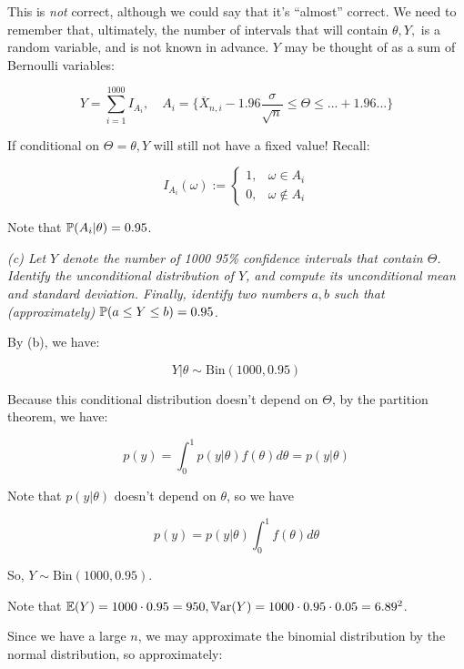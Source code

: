             This is \textit{not} correct, although we could say that it's
            ``almost'' correct. We need to remember that, ultimately, the
            number of intervals that will contain $\theta, Y,$ is a random
            variable, and is not known in advance. $Y$ may be thought of as
            a sum of Bernoulli variables:

            \[
                Y = \sum_{i=1}^{1000} I_{A_i}, \quad A_i =\{\overline
                X_{n,i} - 1.96 \frac{\sigma}{\sqrt{n}} \leq \Theta \leq ...
                + 1.96 ... \}
            \]

            If conditional on $\Theta = \theta, Y$ will still not have a
            fixed value! Recall:

            \[
                I_{A_i}(\omega) := \begin{cases}1, & \omega \in A_i \\ 0, &
                \omega \not \in A_i\end{cases}
            \]

            Note that $\mathbb{P}(A_i | \theta) = 0.95$.

        \textit{(c) Let $Y$ denote the number of 1000 95\% confidence
        intervals that contain $\Theta$. Identify the unconditional
        distribution of $Y$, and compute its unconditional mean and standard
        deviation. Finally, identify two numbers $a, b$ such that
        (approximately) $\mathbb{P}(a \leq Y \leq b) = 0.95$.}

            By (b), we have:

            \[
                Y | \theta \sim \text{Bin}(1000, 0.95)
            \]

            Because this conditional distribution doesn't depend on
            $\Theta$, by the partition theorem, we have:

            \[
                p(y) = \int_0^1 p(y | \theta) f(\theta) d\theta =
                p(y | \theta)
            \]

            Note that $p(y | \theta)$ doesn't depend on $\theta$, so we have

            \[
                p(y) = p(y | \theta) \int_0^1 f(\theta) d\theta
            \]

            So, $Y \sim \text{Bin}(1000, 0.95)$.

            Note that $\mathbb{E}(Y) = 1000 \cdot 0.95 = 950, \mathbb{V}\text{ar}(Y) = 1000 \cdot
            0.95 \cdot 0.05 = 6.89^2$.

            Since we have a large $n$, we may approximate the binomial
            distribution by the normal distribution, so approximately:

